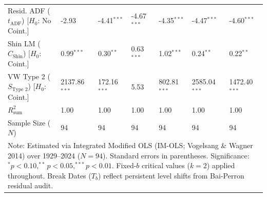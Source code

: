 \begin{table}[H]
\begin{tabular}{p{3.8cm}p{1.35cm}p{1.35cm}p{1.35cm}p{1.35cm}p{1.35cm}p{1.35cm}}
\makecell[l]{Resid. ADF ($t_{\text{ADF}}$) \\ {\scriptsize [$H_0$: No Coint.]}} & -2.93 & -4.41$^{***}$ & -4.67$^{***}$ & -4.35$^{***}$ & -4.47$^{***}$ & -4.60$^{***}$  \\
\makecell[l]{Shin LM ($C_{\text{Shin}}$) \\ {\scriptsize [$H_0$: Coint.]}} & 0.99$^{***}$ & 0.30$^{**}$ & 0.63$^{***}$ & 1.02$^{***}$ & 0.24$^{**}$ & 0.22$^{**}$  \\
\makecell[l]{VW Type 2 ($S_{\text{Type 2}}$) \\ {\scriptsize [$H_0$: Coint.]}} & 2137.86$^{***}$ & 172.16$^{***}$ & 5.53 & 802.81$^{***}$ & 2585.04$^{***}$ & 1472.40$^{***}$  \\
\midrule
$R^2_{\text{sum}}$ & 1.00 & 1.00 & 1.00 & 1.00 & 1.00 & 1.00  \\
Sample Size ($N$) & 94 & 94 & 94 & 94 & 94 & 94  \\
\bottomrule
\multicolumn{7}{p{13.2cm}}{\footnotesize Note: Estimated via Integrated Modified OLS (IM-OLS; Vogelsang \& Wagner 2014) over 1929--2024 ($N=94$). Standard errors in parentheses. Significance: $^*p<0.10, ^{**}p<0.05, ^{***}p<0.01$. Fixed-$b$ critical values ($k=2$) applied throughout. Break Dates ($T_b$) reflect persistent level shifts from Bai-Perron residual audit.}
\end{tabular}
\end{table}

